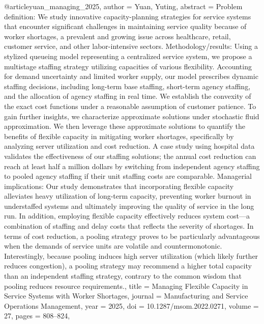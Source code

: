 @article{yuan_managing_2025,
  author = {Yuan, Yuting},
  abstract = {Problem definition: We study innovative capacity-planning strategies for service systems that encounter significant challenges in maintaining service quality because of worker shortages, a prevalent and growing issue across healthcare, retail, customer service, and other labor-intensive sectors. Methodology/results: Using a stylized queueing model representing a centralized service system, we propose a multistage staffing strategy utilizing capacities of various flexibility. Accounting for demand uncertainty and limited worker supply, our model prescribes dynamic staffing decisions, including long-term base staffing, short-term agency staffing, and the allocation of agency staffing in real time. We establish the convexity of the exact cost functions under a reasonable assumption of customer patience. To gain further insights, we characterize approximate solutions under stochastic fluid approximation. We then leverage these approximate solutions to quantify the benefits of flexible capacity in mitigating worker shortages, specifically by analyzing server utilization and cost reduction. A case study using hospital data validates the effectiveness of our staffing solutions; the annual cost reduction can reach at least half a million dollars by switching from independent agency staffing to pooled agency staffing if their unit staffing costs are comparable. Managerial implications: Our study demonstrates that incorporating flexible capacity alleviates heavy utilization of long-term capacity, preventing worker burnout in understaffed systems and ultimately improving the quality of service in the long run. In addition, employing flexible capacity effectively reduces system cost—a combination of staffing and delay costs that reflects the severity of shortages. In terms of cost reduction, a pooling strategy proves to be particularly advantageous when the demands of service units are volatile and countermonotonic. Interestingly, because pooling induces high server utilization (which likely further reduces congestion), a pooling strategy may recommend a higher total capacity than an independent staffing strategy, contrary to the common wisdom that pooling reduces resource requirements.},
  title = {{Managing} {Flexible} {Capacity} {in} {Service} {Systems} {with} {Worker} {Shortages}},
  journal = {Manufacturing and Service Operations Management},
  year = {2025},
  doi = {10.1287/msom.2022.0271},
  volume = {27},
  pages = {808--824},
}

